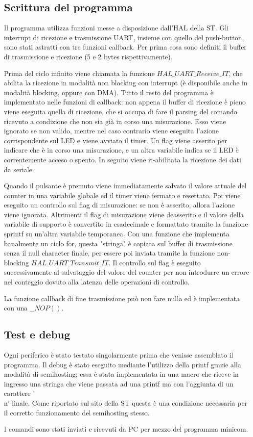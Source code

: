 \documentclass[a4paper]{article}
\begin{document}
	\subsection{Scrittura del programma}
		Il programma utilizza funzioni messe a disposizione dall'HAL della ST. Gli interrupt di ricezione e trasmissione UART, insieme con quello del push-button, sono stati astratti con tre funzioni callback.
		Per prima cosa sono definiti il buffer di trasmissione e ricezione (5 e 2 bytes rispettivamente).
		
		Prima del ciclo infinito viene chiamata la funzione \textbf{$HAL\_UART\_Receive\_IT$}, che abilita la ricezione in modalità non blocking con interrupt (è disponibile anche in modalità blocking, oppure con DMA).
		Tutto il resto del programma è implementato nelle funzioni di callback: non appena il buffer di ricezione è pieno viene eseguita quella di ricezione, che si occupa di fare il parsing del comando ricevuto a condizione che non sia già in corso una misurazione. Esso viene ignorato se non valido, mentre nel caso contrario viene eseguita l'azione corrispondente sul LED e viene avviato il timer. Un flag viene asserito per indicare che è in corso una misurazione, e un altra variabile indica se il LED è correntemente acceso o spento. In seguito viene ri-abilitata la ricezione dei dati da seriale.

		Quando il pulsante è premuto viene immediatamente salvato il valore attuale del counter in una variabile globale ed il timer viene fermato e resettato. Poi viene eseguito un controllo sul flag di misurazione: se non è asserito, allora l'azione viene ignorata. Altrimenti il flag di misurazione viene deasserito e il valore della variabile di supporto è convertito in esadecimale e formattato tramite la funzione sprintf su un'altra variabile temporanea. Con una funzione che implementa banalmente un ciclo for, questa "stringa" è copiata sul buffer di trasmissione senza il null character finale, per essere poi inviata tramite la funzione non-blocking \textbf{$HAL\_UART\_Transmit\_IT$}.
		Il controllo sul flag è eseguito successivamente al salvataggio del valore del counter per non introdurre un errore nel conteggio dovuto alla latenza delle operazioni di controllo.

		La funzione callback di fine trasmissione può non fare nulla ed è implementata con una \textbf{$\_\_NOP()$}.

	\subsection{Test e debug}
		Ogni periferico è stato testato singolarmente prima che venisse assemblato il programma. Il debug è stato eseguito mediante l'utilizzo della printf grazie alla modalità di semihosting; essa è stata implementata in una macro che riceve in ingresso una stringa che viene passata ad una printf ma con l'aggiunta di un carattere '\\n' finale. Come riportato sul sito della ST questa è una condizione necessaria per il corretto funzionamento del semihosting stesso. 

		I comandi sono stati inviati e ricevuti da PC per mezzo del programma minicom.
\end{document}
